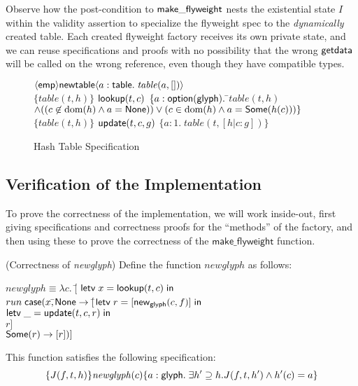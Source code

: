 Observe how the post-condition to $\mathsf{make\_flyweight}$ nests the
existential state $I$ within the validity assertion to specialize the
flyweight spec to the \emph{dynamically} created table. Each created
flyweight factory receives its own private state, and we can reuse
specifications and proofs with no possibility that the wrong
$\mathsf{getdata}$ will be called on the wrong reference, even though
they have compatible types.

\begin{figure}
\begin{specification}
\nextline $\langle{\mathsf{emp}}\rangle{\mathsf{newtable}}\langle{a:\mathsf{table}}.\;{\mathit{table}(a, [])}\rangle$  \\

\nextline $\{\mathit{table}(t, h)\}$
\nextline $\mathsf{lookup}(t, c)$ 
\nextline $\{a:\mathsf{option }{(\mathsf{glyph})}.\;$\=$\mathit{table}(t, h) $ 
\nextline \> $\land ((c \not\in \mbox{dom}({h}) \land a = \mathsf{None})) \vee (c \in \mbox{dom}({h}) \land a = \mathsf{Some}(h(c))) \}$ \\

\nextline $\{\mathit{table}(t, h)\}$
\nextline $\mathsf{update}(t, c, g)$ 
\nextline $\{a:1.\; \mathit{table}(t, [h|c:g])\}$
\end{specification}
\caption{Hash Table Specification}
\label{hash-table-spec}
\end{figure}

\subsection{Verification of the Implementation}

To prove the correctness of the implementation, we will work
inside-out, first giving specifications and correctness proofs for the
``methods'' of the factory, and then using these to prove the correctness
of the $\mathsf{make\_flyweight}$ function. 

\begin{lemma}{(Correctness of \textit{newglyph})}
Define the function $\mathit{newglyph}$ as follows:
\begin{tabbing}
  $\mathit{newglyph} \equiv \lambda c.\; [$\=
     $\mathsf{letv}\;x = \mathsf{lookup}(t,c)\;\mathsf{in}\;$ \\
\>   ${run}\;\mathsf{case}(x, $\=$\mathsf{None} \to [$\=$\mathsf{letv}\;r = [\mathsf{new}_{\mathsf{glyph}}(c,f)]\;\mathsf{in}\;$ \\
\>                                  \>            \>$\mathsf{letv}\;\_ = \mathsf{update}(t, c, r)\;\mathsf{in}\;$ \\
\>                                  \>            \>$r]$\\
\>                                  \>$\mathsf{Some}(r) \to [r])]$ 
\end{tabbing}
\noindent This function satisfies the following specification:
\begin{displaymath}
\{{J(f, t, h)}\}{\mathit{newglyph}(c)}\{{a:\mathsf{glyph}}.\;{\exists h' \supseteq h. J(f, t, h') \land h'(c) = a}\}
\end{displaymath}
\end{lemma}

